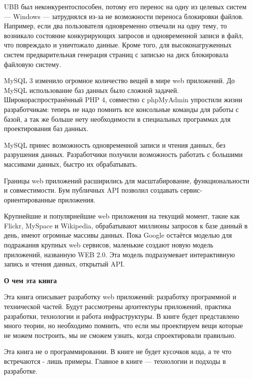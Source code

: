 UBB был неконкурентоспособен, потому его перенос на одну из целевых систем --- Windows --- затруднялся из-за не возможности переноса блокировки файлов. Например, если два пользователя одновременно отвечали на одну тему, то возникало состояние конкурирующих запросов и одновременной записи в файл, что повреждало и уничтожало данные. Кроме того, для высоконагруженных систем предварительная генерация страниц  с записью на диск блокировала файловую систему.


MySQL 3 изменило огромное количество вещей в мире web приложений. До MySQL использование баз данных было сложной задачей. Широкораспространённый PHP 4, совместно с phpMyAdmin упростили жизни разработчикам: теперь не надо помнить все консольные команды для работы с базой, а так же больше нету необходимости в специальных программах для проектирования баз данных.

MySQL принес возможность одновременной записи и чтения данных, без разрушения данных. Разработчики получили возможность работать с большими массивами данных, быстро их обрабатывать.

Границы web приложений расширились для масштабирование, функциональности и совместимости. Бум публичных API позволил создавать сервис-ориентированные приложения.

Крупнейшие и популярнейшие web приложения на текущий момент, такие как  Flickr, MySpace и Wikipedia, обрабатывают миллионы запросов к базе данный в день, имеют огромные массивы данных. Пока Google остаётся моделью для подражания крупных web сервисов, маленькие создают новую модель приложений, названную WEB 2.0. Эта модель подразумевает интерактивную запись и чтения данных, открытый API.


\textbf{О чем эта книга} 

Эта книга описывает разработку web приложений: разработку программной и технической частей. Будут рассмотрены архитектуры приложений, практика разработки, технологии и работа инфраструктуры. В книге будет представлено много теории, но необходимо помнить, что если мы проектируем вещи которые не можем построить, мы не сможем узнать, когда спроектировали правильно.


Эта книга не о программировании. В книге не будет кусочков кода, а те что встречаются - лишь примеры. Главное в книге --- технологии и подходы в разработке.

